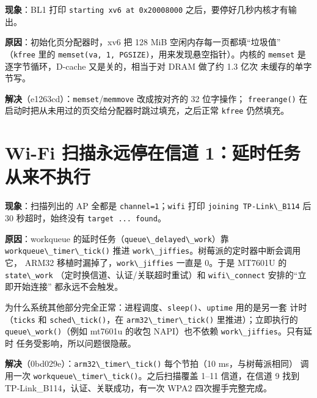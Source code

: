 \textbf{现象}：BL1 打印
\passthrough{\lstinline!starting xv6 at 0x20008000!}
之后，要停好几秒内核才有输出。

\textbf{原因}：初始化页分配器时，xv6 把 128 MiB
空闲内存每一页都填``垃圾值'' （\passthrough{\lstinline!kfree!} 里的
\passthrough{\lstinline!memset(va, 1, PGSIZE)!}，用来发现悬空指针）。内核的
\passthrough{\lstinline!memset!} 是逐字节循环，D-cache
又是关的，相当于对 DRAM 做了约 1.3 亿次 未缓存的单字节写。

\textbf{解决}（e1263cd）：\passthrough{\lstinline!memset!}/\passthrough{\lstinline!memmove!}
改成按对齐的 32 位字操作； \passthrough{\lstinline!freerange()!}
在启动时把从未用过的页交给分配器时跳过填充，之后正常
\passthrough{\lstinline!kfree!} 仍然填充。

\section{Wi-Fi 扫描永远停在信道
1：延时任务从来不执行}\label{wi-fi-ux626bux63cfux6c38ux8fdcux505cux5728ux4fe1ux9053-1ux5ef6ux65f6ux4efbux52a1ux4eceux6765ux4e0dux6267ux884c}

\textbf{现象}：扫描列出的 AP 全都是
\passthrough{\lstinline!channel=1!}；\passthrough{\lstinline!wifi!} 打印
\passthrough{\lstinline!joining TP-Link\_B114!} 后 30 秒超时，始终没有
\passthrough{\lstinline!target ... found!}。

\textbf{原因}：workqueue
的延时任务（\passthrough{\lstinline!queue\_delayed\_work!}）靠
\passthrough{\lstinline!workqueue\_timer\_tick()!} 推进
\passthrough{\lstinline!work\_jiffies!}。树莓派的定时器中断会调用它，
ARM32 移植时漏掉了，\passthrough{\lstinline!work\_jiffies!} 一直是
0。于是 MT7601U 的 \passthrough{\lstinline!state\_work!}
（定时换信道、认证/关联超时重试）和
\passthrough{\lstinline!wifi\_connect!} 安排的``立即开始连接''
都永远不会触发。

为什么系统其他部分完全正常：进程调度、\passthrough{\lstinline!sleep()!}、\passthrough{\lstinline!uptime!}
用的是另一套 计时（\passthrough{\lstinline!ticks!} 和
\passthrough{\lstinline!sched\_tick()!}，在
\passthrough{\lstinline!arm32\_timer\_tick()!} 里推进）；立即执行的
\passthrough{\lstinline!queue\_work()!}（例如 mt7601u 的收包
NAPI）也不依赖 \passthrough{\lstinline!work\_jiffies!}。只有延时
任务受影响，所以问题很隐蔽。

\textbf{解决}（0bd029e）：\passthrough{\lstinline!arm32\_timer\_tick()!}
每个节拍（10 ms，与树莓派相同） 调用一次
\passthrough{\lstinline!workqueue\_timer\_tick()!}。之后扫描覆盖 1--11
信道，在信道 9 找到 TP-Link\_B114，认证、关联成功，有一次 WPA2
四次握手完整完成。

